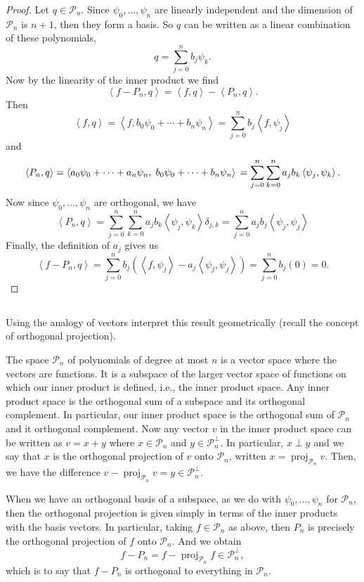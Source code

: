 \documentclass[12pt]{article}
\newenvironment{problem}
    {\begin{lrbox}{\mybox}\begin{minipage}{0.98\textwidth}}
    {\end{minipage}\end{lrbox}\framebox[\textwidth]{\usebox{\mybox}}}
\newcommand{\<}{\left\langle}
\renewcommand{\>}{\right\rangle}
\newcommand{\PP}{\mathcal{P}}
\begin{document}
\begin{proof}
    Let $q \in \PP_n$. Since $\psi_0, \dots, \psi_n$ are linearly independent and the dimension of $\PP_n$ is $n+1$, then they form a basis. So $q$ can be written as a linear combination of these polynomials,
    \[
        q = \sum_{j=0}^n b_j \psi_k.
    \]
    Now by the linearity of the inner product we find
    \[
        \<f - P_n, q\> = \<f, q\> - \<P_n, q\>.
    \]
    Then
    \[
        \<f, q\> = \<f, b_0\psi_0 + \cdots + b_n\psi_n\> = \sum_{j=0}^n b_j \<f, \psi_j\>
    \]
    and
    \[
        \<P_n, q\>
            = \<a_0\psi_0 + \cdots + a_n\psi_n,\; b_0\psi_0 + \cdots + b_n\psi_n\> \\
            = \sum_{j=0}^n \sum_{k=0}^n a_j b_k \<\psi_j, \psi_k\>.
    \]
    Now since $\psi_0, \dots, \psi_n$ are orthogonal, we have
    \[
        \<P_n, q\> = \sum_{j=0}^n \sum_{k=0}^n a_j b_k \<\psi_j, \psi_k\>\delta_{j,k} = \sum_{j=0}^n a_j b_j \<\psi_j, \psi_j\>
    \]
    Finally, the definition of $a_j$ gives us
    \[
        \<f - P_n, q\> = \sum_{j=0}^n b_j(\<f, \psi_j\> - a_j\<\psi_j, \psi_j\>) = \sum_{j=0}^n b_j(0) = 0.
    \]
    
\end{proof}

\newpage
\subsection{}
\begin{problem}
    Using the analogy of vectors interpret this result geometrically (recall the concept of orthogonal projection).
\end{problem}
\medskip

The space $\PP_n$ of polynomials of degree at most $n$ is a vector space where the vectors are functions. It is a subspace of the larger vector space of functions on which our inner product is defined, i.e., the inner product space. Any inner product space is the orthogonal sum of a subspace and its orthogonal complement. In particular, our inner product space is the orthogonal sum of $\PP_n$ and it orthogonal complement. Now any vector $v$ in the inner product space can be written as $v = x + y$ where $x \in \PP_n$ and $y \in \PP_n^\perp$. In particular, $x \perp y$ and we say that $x$ is the orthogonal projection of $v$ onto $\PP_n$, written $x = \operatorname{proj}_{\PP_n} v$. Then, we have the difference $v - \operatorname{proj}_{\PP_n} v = y \in \PP_n^\perp$.

When we have an orthogonal basis of a subspace, as we do with $\psi_0,\dots,\psi_n$ for $\PP_n$, then the orthogonal projection is given simply in terms of the inner products with the basis vectors. In particular, taking $f \in \PP_n$ as above, then $P_n$ is precisely the orthogonal projection of $f$ onto $\PP_n$. And we obtain
\[
    f - P_n = f - \operatorname{proj}_{\PP_n} f \in \PP_n^\perp,
\]
which is to say that $f - P_n$ is orthogonal to everything in $\PP_n$.
\end{document}
